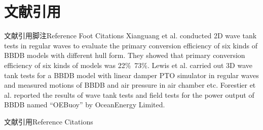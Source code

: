 \documentclass[aspectratio=169, UTF8]{ctexbeamer}
\begin{document}
\section[Reference Citations]{文献引用}

\begin{frame}{文献引用脚注}{Reference Foot Citations}
    Xianguang et al. conducted 2D wave tank tests in regular waves to evaluate the primary conversion efficiency of six kinds of BBDB models with different hull form. They showed that primary conversion efficiency of six kinds of models was 22\%~73\%. Lewis et al.  carried out 3D wave tank tests for a BBDB model with linear damper PTO simulator in regular waves and measured motions of BBDB and air pressure in air chamber etc. Forestier et al.  reported the results of wave tank tests and field tests for the power output of BBDB named “OEBuoy” by OceanEnergy Limited.
\end{frame}

\begin{frame}{文献引用}{Reference Citations}
    \printbibliography[heading=bibintoc, title=ref]
\end{frame}
\end{document}
